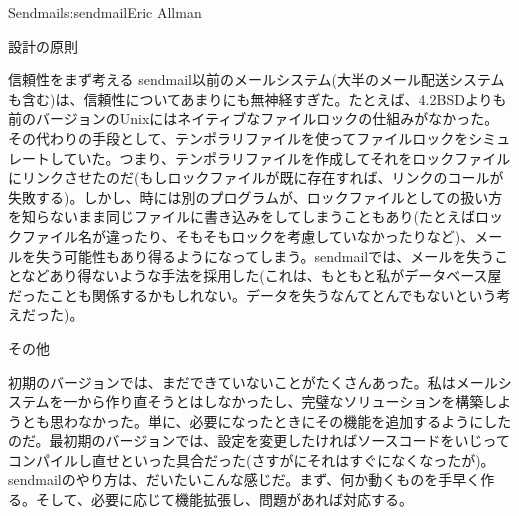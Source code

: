 \begin{aosachapter}{Sendmail}{s:sendmail}{Eric Allman}
\begin{aosasect1}{設計の原則}
\begin{aosasect2}{信頼性をまず考える}
sendmail以前のメールシステム(大半のメール配送システムも含む)は、信頼性についてあまりにも無神経すぎた。たとえば、4.2BSDよりも前のバージョンのUnixにはネイティブなファイルロックの仕組みがなかった。その代わりの手段として、テンポラリファイルを使ってファイルロックをシミュレートしていた。つまり、テンポラリファイルを作成してそれをロックファイルにリンクさせたのだ(もしロックファイルが既に存在すれば、リンクのコールが失敗する)。しかし、時には別のプログラムが、ロックファイルとしての扱い方を知らないまま同じファイルに書き込みをしてしまうこともあり(たとえばロックファイル名が違ったり、そもそもロックを考慮していなかったりなど)、メールを失う可能性もあり得るようになってしまう。sendmailでは、メールを失うことなどあり得ないような手法を採用した(これは、もともと私がデータベース屋だったことも関係するかもしれない。データを失うなんてとんでもないという考えだった)。

\end{aosasect2}

\begin{aosasect2}{その他}

初期のバージョンでは、まだできていないことがたくさんあった。私はメールシステムを一から作り直そうとはしなかったし、完璧なソリューションを構築しようとも思わなかった。単に、必要になったときにその機能を追加するようにしたのだ。最初期のバージョンでは、設定を変更したければソースコードをいじってコンパイルし直せといった具合だった(さすがにそれはすぐになくなったが)。sendmailのやり方は、だいたいこんな感じだ。まず、何か動くものを手早く作る。そして、必要に応じて機能拡張し、問題があれば対応する。


\end{aosasect2}
\end{aosasect1}
\end{aosachapter}
